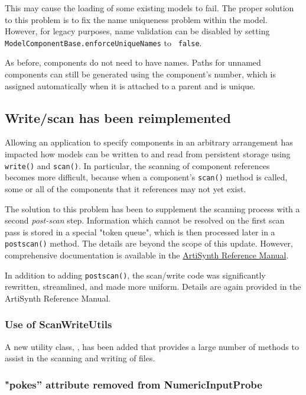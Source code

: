 \documentclass{article}
\begin{document}
\begin{sideblock}
This may cause the loading of some existing models to fail. The proper
solution to this problem is to fix the name uniqueness problem within
the model. However, for legacy purposes, name validation can be
disabled by setting {\tt ModelComponentBase.enforceUniqueNames} to {\tt
false}. 
\end{sideblock}

As before, components do not need to have names.  Paths for unnamed
components can still be generated using the component's number, which
is assigned automatically when it is attached to a parent and is
unique.

\subsection*{Write/scan has been reimplemented}

Allowing an application to specify components in an arbitrary
arrangement has impacted how models can be written to and read from
persistent storage using {\tt write()} and {\tt scan()}. In
particular, the scanning of component references becomes more
difficult, because when a component's {\tt scan()} method is called,
some or all of the components that it references may not yet exist.

The solution to this problem has been to supplement the scanning
process with a second {\it post-scan} step. Information which cannot
be resolved on the first scan pass is stored in a special "token
queue", which is then processed later in a {\tt postscan()}
method. The details are beyond the scope of this update. However,
comprehensive documentation is available in the
\href{http://www.artisynth.org/doc/html/artisynth/artisynth.html}%
{ArtiSynth Reference Manual}.

In addition to adding {\tt postscan()}, the scan/write code was
significantly rewritten, streamlined, and made more uniform.  Details
are again provided in the ArtiSynth Reference Manual.

\subsubsection*{Use of ScanWriteUtils}

A new utility class, 
, has been added
that provides a large number of methods to assist in the scanning and
writing of files.

\subsubsection*{"pokes'' attribute removed from NumericInputProbe}
\end{document}
